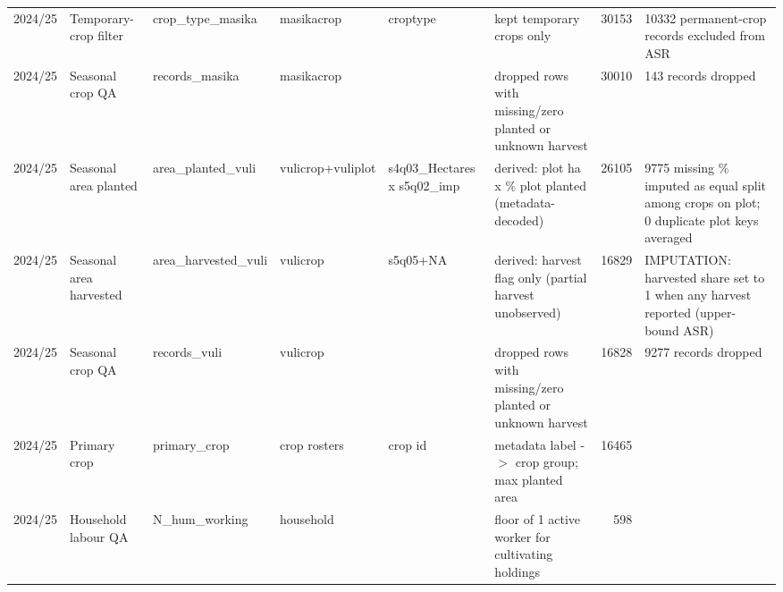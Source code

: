 \begin{tabular}{llllllrl}
 2024/25         & Temporary-crop filter     & crop\_type\_masika          & masikacrop                       & croptype                                  & kept temporary crops only                                                                                    &   30153 & 10332 permanent-crop records excluded from ASR                                                 \\
 2024/25         & Seasonal crop QA          & records\_masika            & masikacrop                       &                                           & dropped rows with missing/zero planted or unknown harvest                                                    &   30010 & 143 records dropped                                                                            \\
 2024/25         & Seasonal area planted     & area\_planted\_vuli         & vulicrop+vuliplot                & s4q03\_Hectares x s5q02\_imp                & derived: plot ha x \% plot planted (metadata-decoded)                                                         &   26105 & 9775 missing \% imputed as equal split among crops on plot; 0 duplicate plot keys averaged      \\
 2024/25         & Seasonal area harvested   & area\_harvested\_vuli       & vulicrop                         & s5q05+NA                                  & derived: harvest flag only (partial harvest unobserved)                                                      &   16829 & IMPUTATION: harvested share set to 1 when any harvest reported (upper-bound ASR)               \\
 2024/25         & Seasonal crop QA          & records\_vuli              & vulicrop                         &                                           & dropped rows with missing/zero planted or unknown harvest                                                    &   16828 & 9277 records dropped                                                                           \\
 2024/25         & Primary crop              & primary\_crop              & crop rosters                     & crop id                                   & metadata label -\ensuremath{>} crop group; max planted area                                                               &   16465 &                                                                                                \\
 2024/25         & Household labour QA       & N\_hum\_working             & household                        &                                           & floor of 1 active worker for cultivating holdings                                                            &     598 &                                                                                                \\

\end{tabular}
